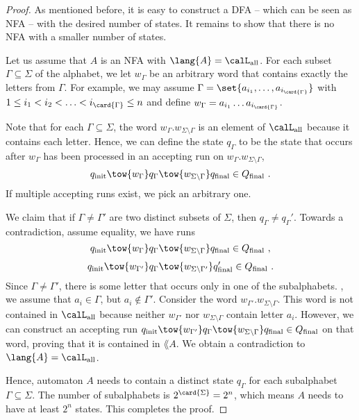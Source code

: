 \documentclass[../../diss.tex]{subfiles}
\begin{document}
\begin{proof}
    As mentioned before, it is easy to construct a DFA -- which can be seen as NFA -- with the desired number of states.
    It remains to show that there is no NFA with a smaller number of states.

    Let us assume that $A$ is an NFA with $\lang{A} = \calL_{\text{all}}$.
    For each subset $\Gamma \subseteq \Sigma$ of the alphabet, we let $w_\Gamma$ be an arbitrary word that contains exactly the letters from $\Gamma$.
    For example, we may assume $\Gamma = \set{ a_{i_1}, \ldots, a_{i_{\card{\Gamma}}}}$ with $1 \leq i_1 < i_2 < \ldots < i_{\card{\Gamma}} \leq n$ and define $w_{\Gamma} = a_{i_1} \ldots a_{i_{\card{\Gamma}}}$.

    Note that for each $\Gamma \subseteq \Sigma$, the word $w_{\Gamma} . w_{\Sigma \setminus \Gamma}$ is an element of $\calL_{\text{all}}$ because it contains each letter.
    Hence, we can define the state $q_\Gamma$ to be the state that occurs after $w_{\Gamma}$ has been processed in an accepting run on $w_{\Gamma} . w_{\Sigma \setminus \Gamma}$, \ie
    \[
        q_\init \tow{ w_{\Gamma} } q_\Gamma \tow{ w_{\Sigma \setminus \Gamma} } q_\final \in Q_\final
        \ .
    \]
    If multiple accepting runs exist, we pick an arbitrary one.

    We claim that if $\Gamma \neq \Gamma'$ are two distinct subsets of $\Sigma$, then $q_\Gamma \neq q_\Gamma'$.
    Towards a contradiction, assume equality, \ie we have runs
    \[
        q_\init \tow{ w_{\Gamma} } q_\Gamma \tow{ w_{\Sigma \setminus \Gamma} } q_\final \in Q_\final
        \ ,
    \]
    \[
        q_\init \tow{ w_{\Gamma'} } q_\Gamma \tow{ w_{\Sigma \setminus \Gamma'} } q_\final' \in Q_\final
        \ .
    \]
    Since $\Gamma \neq \Gamma'$, there is some letter that occurs only in one of the subalphabets.
    \Wolog, we assume that $a_i \in \Gamma$, but $a_i \not \in \Gamma'$.
    Consider the word $w_{\Gamma'}.w_{\Sigma \setminus \Gamma}$.
    This word is not contained in $\calL_{\text{all}}$ because neither $w_{\Gamma'}$ nor $w_{\Sigma \setminus \Gamma}$ contain letter $a_i$.
    However, we can construct an accepting run $q_\init \tow{ w_{\Gamma'} } q_\Gamma \tow{ w_{\Sigma \setminus \Gamma} } q_\final \in Q_\final$ on that word, proving that it is contained in $\lang{A}$.
    We obtain a contradiction to $\lang{A} = \calL_{\text{all}}$.

    Hence, automaton $A$ needs to contain a distinct state $q_\Gamma$ for each subalphabet $\Gamma \subseteq \Sigma$.
    The number of subalphabets is $2^{\card{\Sigma}} = 2^n$, which means $A$ needs to have at least $2^n$ states.
    This completes the proof.
\end{proof}
\end{document}
